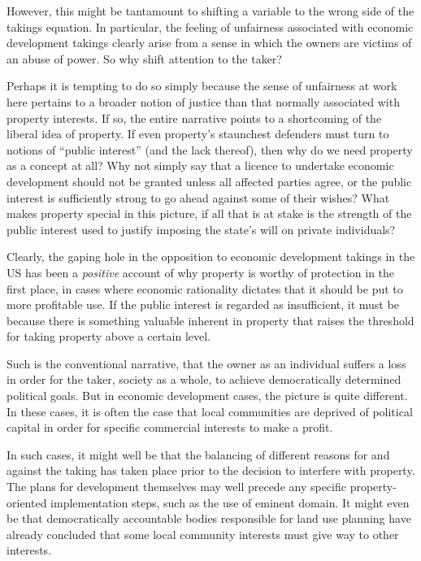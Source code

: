 {{However, this might be tantamount to shifting a variable to the wrong side of the takings equation. In particular, the feeling of unfairness associated with economic development takings clearly arise from a sense in which the owners are victims of an abuse of power. So why shift attention to the taker? 

Perhaps it is tempting to do so simply because the sense of unfairness at work here pertains to a broader notion of justice than that normally associated with property interests. If so, the entire narrative points to a shortcoming of the liberal idea of property. If even property's staunchest defenders must turn to notions of ``public interest'' (and the lack thereof), then why do we need property as a concept at all? Why not simply say that a licence to undertake economic development should not be granted unless all affected parties agree, or the public interest is sufficiently strong to go ahead against some of their wishes? What makes property special in this picture, if all that is at stake is the strength of the public interest used to justify imposing the state's will on private individuals?

Clearly, the gaping hole in the opposition to economic development takings in the US has been a {\it positive} account of why property is worthy of protection in the first place, in cases where economic rationality dictates that it should be put to more profitable use. If the public interest is regarded as insufficient, it must be because there is something valuable inherent in property that raises the threshold for taking property above a certain level.

Such is the conventional narrative, that the owner as an individual suffers a loss in order for the taker, society as a whole, to achieve democratically determined political goals. But in economic development cases, the picture is quite different. In these cases, it is often the case that local communities are deprived of political capital in order for specific commercial interests to make a profit. 

In such cases, it might well be that the balancing of different reasons for and against the taking has taken place prior to the decision to interfere with property. The plans for development themselves may well precede any specific property-oriented implementation steps, such as the use of eminent domain. It might even be that democratically accountable bodies responsible for land use planning have already concluded that some local community interests must give way to other interests.

}}
